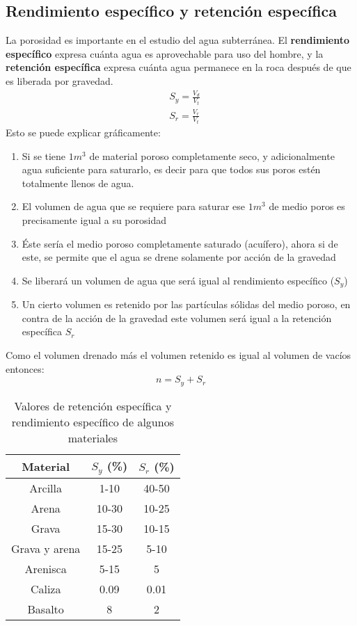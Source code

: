 \subsection{Rendimiento específico y retención específica}
La porosidad es importante en el estudio del agua subterránea.
El \textbf{rendimiento específico} expresa cuánta agua es aprovechable para uso del hombre, y la \textbf{retención específica} expresa cuánta agua permanece en la roca después de que es liberada por gravedad.
\begin{align}
    &S_y = \frac{V_d}{V_t}\\
    &S_r = \frac{V_r}{V_t}
\end{align}
Esto se puede explicar gráficamente:
\begin{enumerate}
    \item Si se tiene $1m^3$ de material poroso completamente seco, y adicionalmente agua suficiente para saturarlo, es decir para que todos sus poros estén totalmente llenos de agua.
    \item El volumen de agua que se requiere para saturar ese $1m^3$ de medio poros es precisamente igual a su porosidad
    \item Éste sería el medio poroso completamente saturado (acuífero), ahora si de este, se permite que el agua se drene solamente por acción de la gravedad
    \item Se liberará un volumen de agua que será igual al rendimiento específico ($S_y$)
    \item Un cierto volumen es retenido por las partículas sólidas del medio poroso, en contra de la acción de la gravedad este volumen será igual a la retención específica $S_r$
\end{enumerate}
Como el volumen drenado más el volumen retenido es igual al volumen de vacíos entonces:
\begin{equation}
    n = S_y+ S_r
\end{equation}
\begin{table}[h!]
    \centering
    \begin{tabular}{@{}ccc@{}}
    \toprule
    Material      & $S_y$ (\%) & $S_r$ (\%) \\ \midrule
    Arcilla       & 1-10       & 40-50      \\
    Arena         & 10-30      & 10-25      \\
    Grava         & 15-30      & 10-15      \\
    Grava y arena & 15-25      & 5-10       \\
    Arenisca      & 5-15       & 5          \\
    Caliza        & 0.09       & 0.01       \\
    Basalto        & 8          & 2          \\ \bottomrule
    \end{tabular}
    \caption{Valores de retención específica y rendimiento específico de algunos materiales}
    \label{tabgh2}
\end{table}
